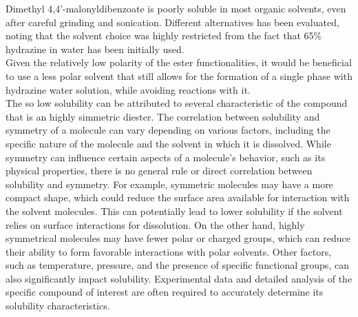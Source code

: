 \documentclass[../Master.tex]{subfiles}
\begin{document}
Dimethyl 4,4’-malonyldibenzoate is poorly soluble in most organic solvents, even after careful grinding and sonication. Different alternatives has been evaluated, noting that the solvent choice was highly restricted from the fact that 65\% hydrazine in water has been initially used. \\
Given the relatively low polarity of the ester functionalities, it would be beneficial to use a less polar solvent that still allows for the formation of a single phase with hydrazine water solution, while avoiding reactions with it.\\
The so low solubility can be attributed to several characteristic of the compound that is an highly simmetric diester. The correlation between solubility and symmetry of a molecule can vary depending on various factors, including the specific nature of the molecule and the solvent in which it is dissolved. While symmetry can influence certain aspects of a molecule's behavior, such as its physical properties, there is no general rule or direct correlation between solubility and symmetry. For example, symmetric molecules may have a more compact shape, which could reduce the surface area available for interaction with the solvent molecules. This can potentially lead to lower solubility if the solvent relies on surface interactions for dissolution. On the other hand, highly symmetrical molecules may have fewer polar or charged groups, which can reduce their ability to form favorable interactions with polar solvents. Other factors, such as temperature, pressure, and the presence of specific functional groups, can also significantly impact solubility. Experimental data and detailed analysis of the specific compound of interest are often required to accurately determine its solubility characteristics.
\end{document}
